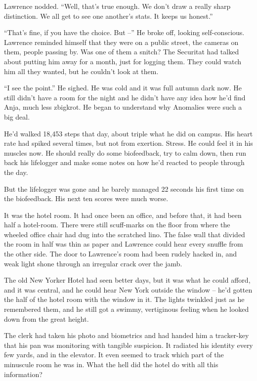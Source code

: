 Lawrence nodded. “Well, that's true enough. We don't draw a really 
sharp distinction. We all get to see one another's stats. It keeps us 
honest.”

“That's fine, if you have the choice. But --” He broke off, looking 
self-conscious. Lawrence reminded himself that they were on a public 
street, the cameras on them, people passing by. Was one of them a 
snitch? The Securitat had talked about putting him away for a month, 
just for logging them. They could watch him all they wanted, but he 
couldn't look at them.

“I see the point.” He sighed. He was cold and it was full autumn 
dark now. He still didn't have a room for the night and he didn't have 
any idea how he'd find Anja, much less zbigkrot. He began to understand 
why Anomalies were such a big deal.

\tb

He'd walked 18,453 steps that day, about triple what he did on campus. 
His heart rate had spiked several times, but not from exertion. Stress. 
He could feel it in his muscles now. He should really do some 
biofeedback, try to calm down, then run back his lifelogger and make 
some notes on how he'd reacted to people through the day.

But the lifelogger was gone and he barely managed 22 seconds his first 
time on the biofeedback. His next ten scores were much worse.

It was the hotel room. It had once been an office, and before that, it 
had been half a hotel-room. There were still scuff-marks on the floor 
from where the wheeled office chair had dug into the scratched lino. 
The false wall that divided the room in half was thin as paper and 
Lawrence could hear every snuffle from the other side. The door to 
Lawrence's room had been rudely hacked in, and weak light shone through 
an irregular crack over the jamb.

The old New Yorker Hotel had seen better days, but it was what he could 
afford, and it was central, and he could hear New York outside the 
window -- he'd gotten the half of the hotel room with the window in it. 
The lights twinkled just as he remembered them, and he still got a 
swimmy, vertiginous feeling when he looked down from the great height.

The clerk had taken his photo and biometrics and had handed him a 
tracker-key that his pan was monitoring with tangible suspicion. It 
radiated his identity every few yards, and in the elevator. It even 
seemed to track which part of the minuscule room he was in. What the 
hell did the hotel do with all this information?

